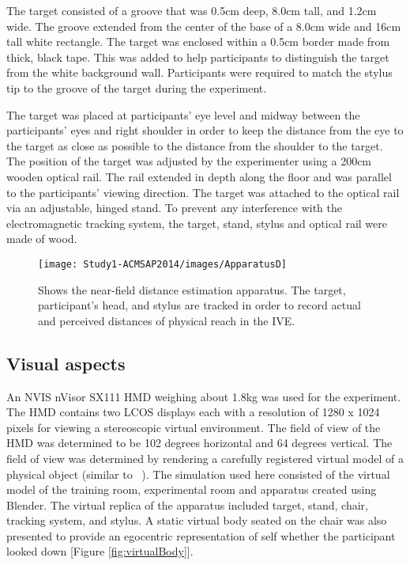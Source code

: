 The target consisted of a groove that was 0.5cm deep, 8.0cm tall, and 1.2cm wide. The groove extended from the center of the base of a 8.0cm wide and 16cm tall white rectangle. The target was enclosed within a 0.5cm border made from thick, black tape. This was added to help participants to distinguish the target from the white background wall. Participants were required to match the stylus tip to the groove of the target during the experiment.

The target was placed at participants' eye level and midway between the participants' eyes and right shoulder in order to keep the distance from the eye to the target as close as possible to the distance from the shoulder to the target. The position of the target was adjusted by the experimenter using a 200cm wooden optical rail. The rail extended in depth along the floor and was parallel to the participants' viewing direction. The target was attached to the optical rail via an adjustable, hinged stand. To prevent any interference with the electromagnetic tracking system, the target, stand, stylus and optical rail were made of wood.

\begin{figure}[th!]
	\centering
	\texttt{[image: Study1-ACMSAP2014/images/ApparatusD]}
	\caption{Shows the near-field distance estimation apparatus. The target, participant's head, and stylus are tracked in order to record actual and perceived distances of physical reach in the IVE.}
	\label{fig:apparatus}
	
\end{figure}

\subsection{Visual aspects}\label{VisualAspect}

An NVIS nVisor SX111 HMD weighing about 1.8kg was used for the experiment. The HMD contains two LCOS displays each with a resolution of 1280 x 1024 pixels for viewing a stereoscopic virtual environment. The field of view of the HMD was determined to be 102 degrees horizontal and 64 degrees vertical. The field of view was determined by rendering a carefully registered virtual model of a physical object (similar to ~\cite{NAB+11}). The simulation used here consisted of the virtual model of the training room, experimental room and apparatus created using Blender. The virtual replica of the apparatus included target, stand, chair, tracking system, and stylus. A static virtual body seated on the chair was also presented to provide an egocentric representation of self whether the participant looked down [Figure \ref{fig:virtualBody}].

